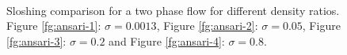 \documentclass[a4paper,conference]{IEEEtran}
\begin{document}
  \begin{figure}[H]
  \centering
     \\ 
     \\ 
     \\ 
   \caption{Sloshing comparison for a two phase flow for different density ratios. Figure \ref{fg:ansari-1}: $\sigma=0.0013$, Figure \ref{fg:ansari-2}: $\sigma=0.05$, Figure \ref{fg:ansari-3}: $\sigma=0.2$ and Figure \ref{fg:ansari-4}: $\sigma=0.8$.
}
   \label{fg:ansari-results}                %
\end{figure}
\end{document}
